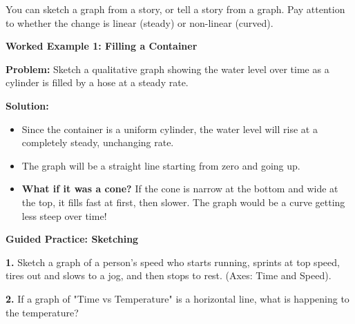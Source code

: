 \documentclass[12pt, letterpaper, fleqn]{article}
\begin{document}
\noindent
You can sketch a graph from a story, or tell a story from a graph. Pay attention to whether the change is linear (steady) or non-linear (curved).

\vspace{3mm}

\begin{tcolorbox}[colback=white, colframe=black!25, boxrule=0.6pt, arc=4mm, left=6mm, right=6mm, top=5mm, bottom=5mm]

\textbf{Worked Example 1: Filling a Container}

\medskip

\textbf{Problem:} Sketch a qualitative graph showing the water level over time as a cylinder is filled by a hose at a steady rate.

\medskip

\textbf{Solution:}
\begin{itemize}
    \item Since the container is a uniform cylinder, the water level will rise at a completely steady, unchanging rate.
    \item The graph will be a straight line starting from zero and going up.
    \item \textbf{What if it was a cone?} If the cone is narrow at the bottom and wide at the top, it fills fast at first, then slower. The graph would be a curve getting less steep over time!
\end{itemize}

\end{tcolorbox}

\vspace{4mm}

\begin{tcolorbox}[colback=white!15, colframe=black, boxrule=1.5pt, arc=4mm, left=6mm, right=6mm, top=5mm, bottom=5mm]

\textbf{Guided Practice: Sketching}

\medskip

\noindent
\textbf{1.} Sketch a graph of a person's speed who starts running, sprints at top speed, tires out and slows to a jog, and then stops to rest. (Axes: Time and Speed).
\vspace{3cm}

\noindent
\textbf{2.} If a graph of "Time vs Temperature" is a horizontal line, what is happening to the temperature?
\vspace{1.5cm}

\end{tcolorbox}
\end{document}
